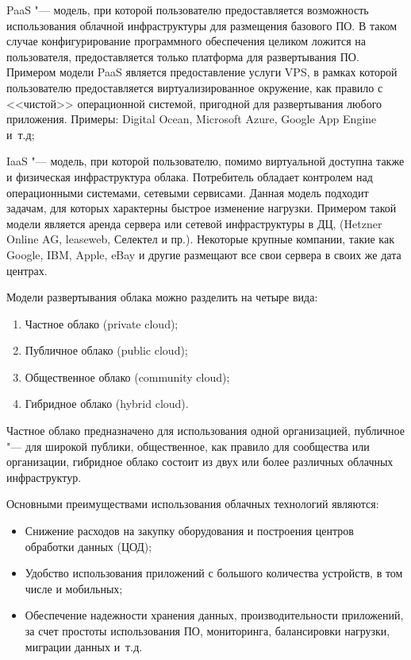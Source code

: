 PaaS "--- модель, при которой пользователю предоставляется возможность использования облачной инфраструктуры для размещения базового ПО.
В таком случае конфигурирование программного обеспечения целиком ложится на пользователя, предоставляется только платформа для развертывания ПО.
Примером модели PaaS является предоставление услуги VPS, в рамках которой пользователю предоставляется виртуализированное окружение, как правило с <<чистой>> операционной системой, пригодной для развертывания любого приложения. 
Примеры: Digital Ocean, Microsoft Azure, Google App Engine и~т.д;

IaaS "--- модель, при которой пользователю, помимо виртуальной доступна также и физическая инфраструктура облака.
Потребитель обладает контролем над операционными системами, сетевыми сервисами.
Данная модель подходит задачам, для которых характерны быстрое изменение нагрузки.
Примером такой модели является аренда сервера или сетевой инфраструктуры в ДЦ, (Hetzner Online AG, leaseweb, Селектел и пр.).
Некоторые крупные компании, такие как Google, IBM, Apple, eBay и другие размещают все свои сервера в своих же дата центрах.

Модели развертывания облака можно разделить на четыре вида:
\begin{enumerate}
    \item Частное облако (private cloud);
    \item Публичное облако (public cloud);
    \item Общественное облако (community cloud);
    \item Гибридное облако (hybrid cloud).
\end{enumerate}

Частное облако предназначено для использования одной организацией, публичное "--- для широкой публики, общественное, как правило для сообщества или организации, гибридное облако состоит из двух или более различных облачных инфраструктур.

Основными преимуществами использования облачных технологий являются:
\begin{itemize}
    \item Снижение расходов на закупку оборудования и построения центров обработки данных (ЦОД);
    \item Удобство использования приложений с большого количества устройств, в том числе и мобильных;
    \item Обеспечение надежности хранения данных, производительности приложений, за счет простоты использования ПО, мониторинга, балансировки нагрузки, миграции данных и~т.д. 
\end{itemize}

